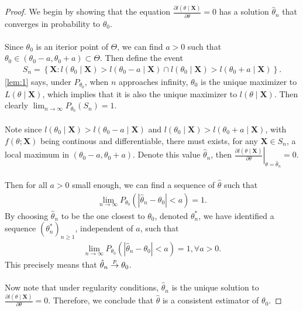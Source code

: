 \begin{proof}
We begin by showing that the equation $\frac{\partial l(\theta\mid \bm{X})}{\partial\theta}=0$ has a solution $\hat{\theta}_n$ that converges in probability to $\theta_0$.\\\\
Since $\theta_0$ is an iterior point of $\Theta$, we can find $a>0$ such that $\theta_0 \in (\theta_0-a, \theta_0+a) \subset \Theta$. Then define the event
\begin{align*}
S_n = \left\{ \bm{X}: l(\theta_0 \mid \bm{X}) > l(\theta_0 - a \mid \bm{X}) \cap l(\theta_0 \mid \bm{X}) > l(\theta_0 + a \mid \bm{X}) \right\}.
\end{align*}
\cref{lem:1} says, under $P_{\theta_0}$, when $n$ approaches infinity, $\theta_0$ is the unique maximizer to $L(\theta\mid \bm{X})$, which implies that it is also the unique maximizer to $l(\theta\mid \bm{X})$. Then clearly $\lim_{n\to\infty}P_{\theta_0}(S_n) = 1$.\\\\
Note since $l(\theta_0\mid \bm{X}) > l(\theta_0-a\mid \bm{X})$ and $l(\theta_0\mid \bm{X}) > l(\theta_0+a\mid \bm{X})$, with $f(\theta; \bm{X})$ being continous and differentiable, there must exists, for any $\bm{X}\in S_n$, a local maximum in $(\theta_0-a, \theta_0+a)$. Denote this value $\hat{\theta}_n$, then $\left.\frac{\partial l(\theta\mid \bm{X})}{\partial\theta}\right\vert_{\theta=\hat{\theta}_n}=0$.\\\\
Then for all $a>0$ small enough, we can find a sequence of $\hat{\theta}$ such that
\begin{align*}
\lim_{n\to\infty}P_{\theta_0}\left( |\hat{\theta}_n - \theta_0| < a \right) = 1.
\end{align*}
By choosing $\hat{\theta}_n$ to be the one closest to $\theta_0$, denoted $\theta^*_n$, we have identified a sequence $\left(\theta^*_n\right)_{n\geq1}$, independent of $a$, such that
\begin{align*}
\lim_{n\to\infty}P_{\theta_0}\left( |\hat{\theta}_n - \theta_0| < a \right) = 1, \forall a > 0.
\end{align*}
This precisely means that $\hat{\theta}_n \overset{p}{\rightarrow} \theta_0$.\\\\
Now note that under regularity conditions, $\hat{\theta}_n$ is the unique solution to $\frac{\partial l(\theta\mid \bm{X})}{\partial\theta}=0$. Therefore, we conclude that $\hat{\theta}$ is a consistent estimator of $\theta_0$.
\end{proof}
